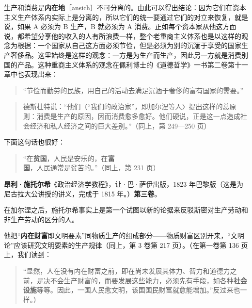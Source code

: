 生产和消费是\textbf{内在地}［ansich］不可分离的。由此可以得出结论：因为它们在资本主义生产体系内实际上是分离的，所以它们的统一要通过它们的对立来恢复，就是说，如果 A 必须为 B 生产，B 就必须为 A 消费。正如每个资本家从他这方面说，都希望分享他的收入的人有所浪费一样，整个老重商主义体系也是以这样的观念为根据：一个国家从自己这方面必须节俭，但是必须为别的沉湎于享受的国家生产奢侈品。这里始终是这样的观念：一方是为生产而生产，因此另一方就是消费别国的产品。这种重商主义体系的观念在佩利博士的《道德哲学》一书第二卷第十一章中也表现出来：

\begin{quote}“节俭而勤劳的民族，用自己的活动去满足沉湎于奢侈的富有国家的需要。”\end{quote}


\begin{quote}德斯杜特说：“他们〈“我们的政治家”，即加尔涅等人〉提出这样的总原则：消费是生产的原因，因而消费愈多愈好。他们硬说，正是这一点造成社会经济和私人经济之间的巨大差别。”（同上，第 249—250 页）\end{quote}

下面这句话也很好：

\begin{quote}“在\textbf{贫国}，人民是安乐的，在\textbf{富国}，人民通常是贫苦的。”（同上，第 231 页）\end{quote}


\textbf{昂利·施托尔希}《政治经济学教程》，让·巴·萨伊出版，1823 年巴黎版（这是为尼古拉大公讲授的讲义，完成于 1815 年。）\textbf{第三卷}。

在加尔涅之后，施托尔希事实上是第一个试图以新的论据来反驳斯密对生产劳动和非生产劳动的区分的人。

他把“\textbf{内在财富}即文明要素”同物质生产的组成部分——物质财富区别开来，“文明论”应该研究文明要素的生产规律（同上，第 3 卷第 217 页）。（在第一卷第 136 页上，我们读到：

\begin{quote}“显然，人在没有内在财富之前，即在尚未发展其体力、智力和道德力之前，是决不会生产财富的，而要发展这些能力，必须先有手段，如各种\textbf{社会设施}等等。因此，一国人民愈文明，该国国民财富就愈能增加。”反过来也一样。）\end{quote}

